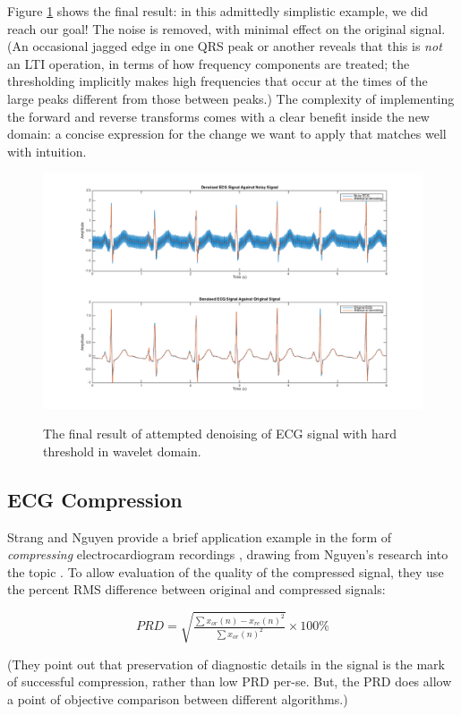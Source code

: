 \documentclass[letterpaper]{article}
\begin{document}
Figure \ref{fig:ecgcleaned} shows the final result:
in this admittedly simplistic example, we did reach our goal!
The noise is removed, with minimal effect on the original signal.
(An occasional jagged edge in one QRS peak or another reveals that this is \emph{not} an LTI operation,
in terms of how frequency components are treated;
the thresholding implicitly makes high frequencies that occur at the times of the large peaks
different from those between peaks.)
The complexity of implementing the forward and reverse transforms comes with a clear benefit inside the new domain:
a concise expression for the change we want to apply that matches well with intuition.

\begin{figure}[h]
  \caption{The final result of attempted denoising of ECG signal with hard threshold in wavelet domain.}
  \centering
    \includegraphics[width=1\textwidth]{figures/ecgcleaned}
  \label{fig:ecgcleaned}
\end{figure}

\subsection{ECG Compression}
Strang and Nguyen provide a brief application example in the form of \emph{compressing} electrocardiogram recordings \cite[p.~385]{strang},
drawing from Nguyen's research into the topic \cite{nguyenecg}.
To allow evaluation of the quality of the compressed signal, they use the percent RMS difference between original and compressed signals:

\[
PRD = \sqrt{\tfrac{\sum{x_{or}(n)-x_{re}(n)}^2}{\sum{x_{or}(n)}^2}}  \times 100\%
\]

(They point out that preservation of diagnostic details in the signal is the mark of successful compression, rather than low PRD per-se.
But, the PRD does allow a point of objective comparison between different algorithms.)
\end{document}
